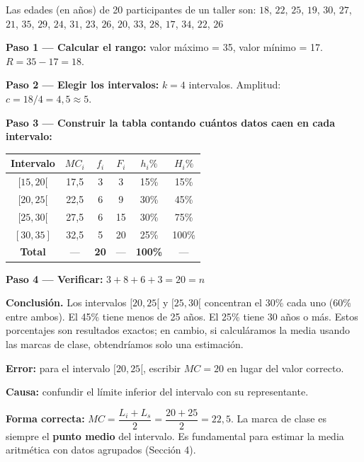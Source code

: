 \documentclass[11pt, letterpaper]{article}
\begin{document}
\begin{tcolorbox}[examplebox, title={Ej. 4. Tabla de frecuencias para datos agrupados}]
Las edades (en años) de 20 participantes de un taller son:
$18$, $22$, $25$, $19$, $30$, $27$, $21$, $35$, $29$, $24$,
$31$, $23$, $26$, $20$, $33$, $28$, $17$, $34$, $22$, $26$

\textbf{Paso 1 --- Calcular el rango:} valor máximo = 35, valor mínimo = 17. \quad $R = 35 - 17 = 18$.
\medskip

\textbf{Paso 2 --- Elegir los intervalos:} $k = 4$ intervalos. Amplitud: $c = 18/4 = 4{,}5 \approx 5$.
\medskip

\textbf{Paso 3 --- Construir la tabla contando cuántos datos caen en cada intervalo:}
  \begin{center}
  \renewcommand{\arraystretch}{1.3}
  \begin{tabular}{c c c c c c}
  \toprule
  Intervalo & $MC_i$ & $f_i$ & $F_i$ & $h_i\%$ & $H_i\%$\\
  \midrule
  $[15,20[$ & 17{,}5 & 3 & 3  & 15\% & 15\%\\
  $[20,25[$ & 22{,}5 & 6 & 9  & 30\% & 45\%\\
  $[25,30[$ & 27{,}5 & 6 & 15 & 30\% & 75\%\\
  $[30,35]$ & 32{,}5 & 5 & 20 & 25\% & 100\%\\
  \midrule
  \textbf{Total} & --- & \textbf{20} & --- & \textbf{100\%} & ---\\
  \bottomrule
  \end{tabular}
  \end{center}
\medskip

\textbf{Paso 4 --- Verificar:} $3+8+6+3 = 20 = n$ \checkmark
\medskip

\noindent\textbf{Conclusión.} Los intervalos $[20,25[$ y $[25,30[$ concentran el 30\% cada uno (60\% entre ambos). El 45\% tiene menos de 25 años. El 25\% tiene 30 años o más. Estos porcentajes son resultados exactos; en cambio, si calculáramos la media usando las marcas de clase, obtendríamos solo una estimación.

\end{tcolorbox}

\begin{tcolorbox}[warningbox, title={Error frecuente: usar el límite del intervalo como marca de clase}]
\textbf{Error:} para el intervalo $[20, 25[$, escribir $MC = 20$ en lugar del valor correcto.

\medskip

\textbf{Causa:} confundir el límite inferior del intervalo con su representante.

\medskip

\textbf{Forma correcta:} $MC = \dfrac{L_i + L_s}{2} = \dfrac{20 + 25}{2} = 22{,}5$. La marca de clase es siempre el \textbf{punto medio} del intervalo. Es fundamental para estimar la media aritmética con datos agrupados (Sección 4).
\end{tcolorbox}
\end{document}
